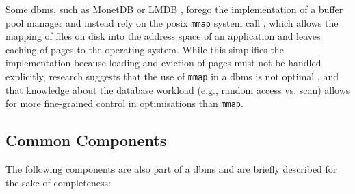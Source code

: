 Some \acrshort{dbms}, such as MonetDB \cite{Boncz:2008Breaking} or LMDB \cite{Henry:2019Howard}, forego the implementation of a buffer pool manager and instead rely on the \acrshort{posix} \texttt{mmap} system call \cite{Stonebraker:1981Operating}, which allows the mapping of files on disk into the address space of an application and leaves caching of pages to the operating system. While this simplifies the implementation because loading and eviction of pages must not be handled explicitly, research suggests that the use of \texttt{mmap} in a \acrshort{dbms} is not optimal \cite{Crotty:2022Are}, and that knowledge about the database workload (e.g., random access vs. scan) allows for more fine-grained control in optimisations than \texttt{mmap}.

\subsection{Common Components}

The following components are also part of a \acrshort{dbms} and are briefly described for the sake of completeness:

